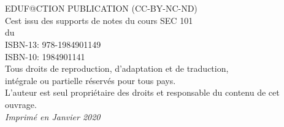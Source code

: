 
\newpage

~\vfill
\thispagestyle{empty}

\noindent {\Huge\ccbyncndeu}\\ 

 EDUF@CTION PUBLICATION (CC-BY-NC-ND)\\ %


\noindent C\edoc est issu des supports de notes du cours SEC 101 \\ du \uCnam \\
ISBN-13: 978-1984901149 \\
ISBN-10: 1984901141 \\
Tous droits de reproduction, d’adaptation et de traduction,\\
intégrale ou partielle réservés pour tous pays.\\
L’auteur est seul propriétaire des droits et responsable du contenu de cet ouvrage.\\

\noindent \textit{Imprimé en Janvier 2020 \\ \printer} %